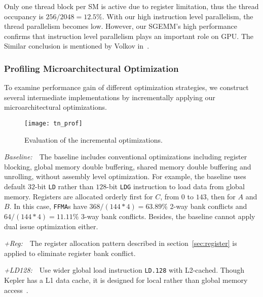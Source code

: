 
Only one thread block per SM is active due to register limitation, thus the thread occupancy is $256/2048=12.5\%$.
With our high instruction level parallelism, the thread parallelism becomes low.
However, our SGEMM's high performance confirms that instruction level parallelism plays an important role on GPU.
The Similar conclusion is mentioned by Volkov in~\cite{volkov2010better}.

\subsubsection{Profiling Microarchitectural Optimization}

To examine performance gain of different optimization strategies, we construct several intermediate 
implementations by incrementally applying our microarchitectural optimizations.
\begin{figure}[htbp]
\begin{center}
\texttt{[image: tn\_prof]}
    \caption{Evaluation of the incremental optimizations.}
\label{fig:th_prof}
\end{center}
\end{figure}

{\it Baseline:}~~The baseline includes conventional optimizations including register blocking, global
memory double buffering, shared memory double buffering and unrolling, without assembly level optimization.
For example, the baseline uses default $32$-bit {\tt LD} rather than $128$-bit {\tt LDG} instruction to load data from global memory.
Registers are allocated orderly first for $C$, from $0$ to $143$, then for $A$ and $B$. 
In this case, {\tt FFMA}s have $368/(144*4)=63.89\%$ 2-way bank conflicts and $64/(144*4)=11.11\%$ 3-way bank conflicts. 
Besides, the baseline cannot apply dual issue optimization either.

{\it +Reg:}~~The register allocation pattern described in section~\ref{sec:register} is applied to eliminate register bank conflict. 

{\it +LD128:}~~Use wider global load instruction {\tt LD.128} with L2-cached.
Though Kepler has a L1 data cache, it is designed for local rather than global memory access~\cite{gk110}.

